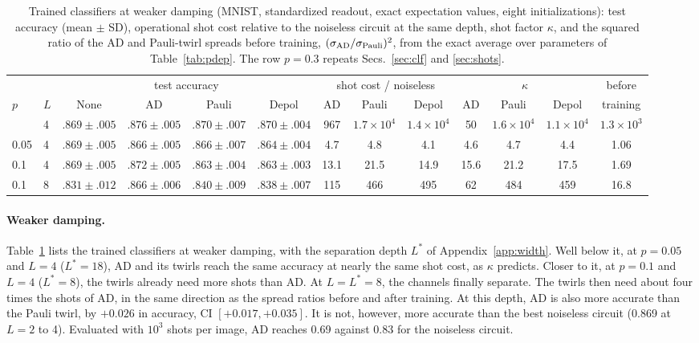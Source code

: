 \documentclass[
 aps,pra,
 twocolumn,
 superscriptaddress,
 longbibliography,
 nofootinbib
]{revtex4-2}
\newcommand{\AD}{\mathrm{AD}}
\begin{document}
\begin{table}[t]
\caption{Trained classifiers at weaker damping (MNIST, standardized readout,
exact expectation values, eight initializations): test accuracy (mean $\pm$ SD), operational
shot cost relative to the noiseless circuit at the same depth, shot factor
$\kappa$, and the squared ratio of the AD and Pauli-twirl spreads before
training, $(\sigma_{\AD}/\sigma_{\rm Pauli})^2$, from the exact average over
parameters of Table~\ref{tab:pdep}. The row $p=0.3$ repeats
Secs.~\ref{sec:clf} and \ref{sec:shots}.}
\label{tab:pdep_trained}
\begin{ruledtabular}
\begin{tabular}{llccccccccccc}
 & & \multicolumn{4}{c}{test accuracy} & \multicolumn{3}{c}{shot cost / noiseless} & \multicolumn{3}{c}{$\kappa$} & before\\
$p$ & $L$ & None & AD & Pauli & Depol & AD & Pauli & Depol & AD & Pauli & Depol & training\\
\colrule
0.3 & 4 & $.869\pm.005$ & $.876\pm.005$ & $.870\pm.007$ & $.870\pm.004$ & 967 & $1.7\times10^4$ & $1.4\times10^4$ & 50 & $1.6\times10^4$ & $1.1\times10^4$ & $1.3\times10^3$\\
0.05 & 4 & $.869\pm.005$ & $.866\pm.005$ & $.866\pm.007$ & $.864\pm.004$ & 4.7 & 4.8 & 4.1 & 4.6 & 4.7 & 4.4 & 1.06\\
0.1 & 4 & $.869\pm.005$ & $.872\pm.005$ & $.863\pm.004$ & $.863\pm.003$ & 13.1 & 21.5 & 14.9 & 15.6 & 21.2 & 17.5 & 1.69\\
0.1 & 8 & $.831\pm.012$ & $.866\pm.006$ & $.840\pm.009$ & $.838\pm.007$ & 115 & 466 & 495 & 62 & 484 & 459 & 16.8\\
\end{tabular}
\end{ruledtabular}
\end{table}

\paragraph{Weaker damping.}
Table~\ref{tab:pdep_trained} lists the trained classifiers at weaker damping,
with the separation depth $L^*$ of Appendix~\ref{app:width}.
Well below it, at $p=0.05$ and $L=4$ ($L^*=18$), AD and its
twirls reach the same accuracy at nearly the same shot cost, as $\kappa$
predicts. Closer to it, at $p=0.1$ and $L=4$ ($L^*=8$), the twirls already
need more shots than AD. At $L=L^*=8$, the channels finally separate. The
twirls then need about four times the shots of AD, in the same direction as the
spread ratios before and after training. At this depth, AD is also more
accurate than the Pauli twirl, by $+0.026$ in accuracy, CI $[+0.017,+0.035]$.
It is not, however, more accurate than the best noiseless circuit (0.869 at
$L=2$ to 4). Evaluated with $10^3$ shots per image, AD reaches 0.69 against
0.83 for the noiseless circuit.
\end{document}
